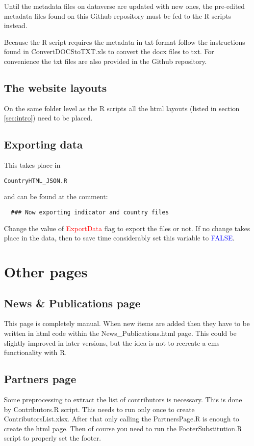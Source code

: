\documentclass[a4paper]{article}
\begin{document}
Until the metadata files on dataverse are updated with new ones, the pre-edited 
metadata files found on this Github repository must be fed to the R scripts 
instead. 

Because the R script requires the metadata in txt format follow the 
instructions found in ConvertDOCStoTXT.xls to convert the docx files to txt.
For convenience the txt files are also provided in the Github repository.

\subsection{The website layouts}

On the same folder level as the R scripts all the html layouts (listed in 
section \ref{sec:intro}) need to be placed.

\subsection{Exporting data}
 This takes place in \begin{verbatim}CountryHTML_JSON.R\end{verbatim} and can 
be found at the comment: 
 \begin{verbatim}
  ### Now exporting indicator and country files
 \end{verbatim}

Change the value of \textcolor{red}{ExportData} flag to export the files or 
not. If no change takes place in the data, then to save time considerably set 
this variable to \textcolor{blue}{FALSE}.

\section{Other pages}
\subsection{News \& Publications page}
This page is completely manual. When new items are added then they have to be 
written in html code within the News\_Publications.html page. This could be 
slightly improved in later versions, but the idea is not to recreate a cms 
functionality with R.

\subsection{Partners page}

Some preprocessing to extract the list of contributors is necessary. This is 
done by Contributors.R script. This needs to run only once to create 
ContributorsList.xlsx. After that only calling the PartnersPage.R is enough to 
create the html page. Then of course you need to run the FooterSubstitution.R 
script to properly set the footer.
\end{document}
